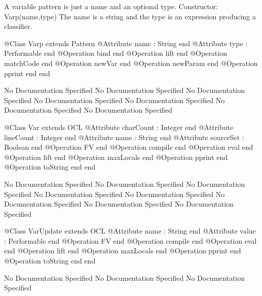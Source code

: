       A variable pattern is just a name and an optional type.
      Constructor: Varp(name,type)
        The name is a string and the type is an expression producing a classifier.
\begin{Interface}
@Class Varp extends Pattern
  @Attribute name : String end
  @Attribute type : Performable end
  @Operation bind end
  @Operation lift end
  @Operation matchCode end
  @Operation newVar end
  @Operation newParam end
  @Operation pprint end
end
\end{Interface}
No Documentation Specified
No Documentation Specified
No Documentation Specified
No Documentation Specified
No Documentation Specified
No Documentation Specified
No Documentation Specified
\begin{Interface}
@Class Var extends OCL
  @Attribute charCount : Integer end
  @Attribute lineCount : Integer end
  @Attribute name : String end
  @Attribute sourceSet : Boolean end
  @Operation FV end
  @Operation compile end
  @Operation eval end
  @Operation lift end
  @Operation maxLocals end
  @Operation pprint end
  @Operation toString end
end
\end{Interface}
No Documentation Specified
No Documentation Specified
No Documentation Specified
No Documentation Specified
No Documentation Specified
No Documentation Specified
No Documentation Specified
No Documentation Specified
\begin{Interface}
@Class VarUpdate extends OCL
  @Attribute name : String end
  @Attribute value : Performable end
  @Operation FV end
  @Operation compile end
  @Operation eval end
  @Operation lift end
  @Operation maxLocals end
  @Operation pprint end
  @Operation toString end
end
\end{Interface}
No Documentation Specified
No Documentation Specified
No Documentation Specified
